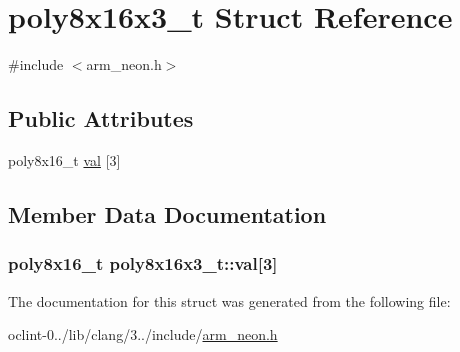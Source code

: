 \hypertarget{structpoly8x16x3__t}{\section{poly8x16x3\-\_\-t Struct Reference}
\label{structpoly8x16x3__t}
}


{\ttfamily \#include $<$arm\-\_\-neon.\-h$>$}

\subsection*{Public Attributes}
\begin{DoxyCompactItemize}
\item 
poly8x16\-\_\-t \hyperlink{structpoly8x16x3__t_a8a6845b8ab48eff4f9ee247448264efe}{val} \mbox{[}3\mbox{]}
\end{DoxyCompactItemize}


\subsection{Member Data Documentation}
\hypertarget{structpoly8x16x3__t_a8a6845b8ab48eff4f9ee247448264efe}{
\subsubsection[{val}]{\setlength{\rightskip}{0pt plus 5cm}poly8x16\-\_\-t poly8x16x3\-\_\-t\-::val\mbox{[}3\mbox{]}}}\label{structpoly8x16x3__t_a8a6845b8ab48eff4f9ee247448264efe}


The documentation for this struct was generated from the following file\-:\begin{DoxyCompactItemize}
\item 
oclint-\/0../lib/clang/3../include/\hyperlink{arm__neon_8h}{arm\-\_\-neon.\-h}\end{DoxyCompactItemize}
